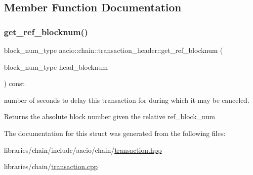 \subsection{Member Function Documentation}
\mbox{\label{structaacio_1_1chain_1_1transaction__header_a75c22201048da255df9412817957df5f}} 
\subsubsection{\texorpdfstring{get\+\_\+ref\+\_\+blocknum()}{get\_ref\_blocknum()}}
{\footnotesize\ttfamily block\+\_\+num\+\_\+type aacio\+::chain\+::transaction\+\_\+header\+::get\+\_\+ref\+\_\+blocknum (\begin{DoxyParamCaption}\item[{block\+\_\+num\+\_\+type}]{head\+\_\+blocknum }\end{DoxyParamCaption}) const\hspace{0.3cm}{\ttfamily [inline]}}



number of seconds to delay this transaction for during which it may be canceled. 

\begin{DoxyReturn}{Returns}
the absolute block number given the relative ref\+\_\+block\+\_\+num 
\end{DoxyReturn}


The documentation for this struct was generated from the following files\+:\begin{DoxyCompactItemize}
\item 
libraries/chain/include/aacio/chain/\mbox{\hyperlink{libraries_2chain_2include_2aacio_2chain_2transaction_8hpp}{transaction.\+hpp}}\item 
libraries/chain/\mbox{\hyperlink{transaction_8cpp}{transaction.\+cpp}}\end{DoxyCompactItemize}
